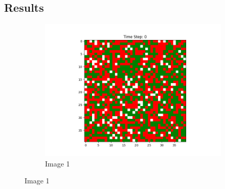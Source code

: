 \documentclass[12pt]{article}
\begin{document}
	\subsection{Results}
	\begin{figure}[h]
		\centering
		\begin{subfigure}{0.2\textwidth}
			\includegraphics[width=\linewidth]{initial_random.png}
			\caption{Image 1}
		\end{subfigure}\hspace{0.02\textwidth}
		

\end{figure}
\end{document}
